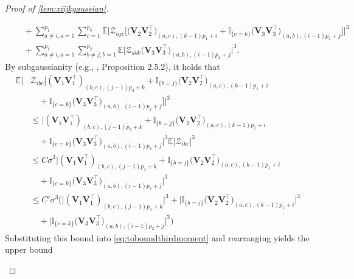 \documentclass[10pt]{article}
\newcommand{\0}{{\mathbf{0}}}
\newcommand{\1}{{\mathbf{1}}}
\newcommand{\E}{{\mathbf{E}}}
\renewcommand{\citet}{\cite}
\renewcommand{\t}{^{\top}}
\renewcommand{\E}{\mathbb{E}}
\begin{document}
\begin{proof}[Proof of \cref{lem:xiijkgaussian}]
\begin{itemize}
\begin{align}
    &\quad + \sum_{a\neq i, a=1}^{p_1} \sum_{c=1}^{p_3} \E \bigg| \mathcal{Z}_{ajc} \bigg[ \big(\mathbf{V}_2 \mathbf{V}_2\t \big)_{(a,c),(k-1)p_1 + i} + \mathbb{I}_{\{c = k \}} \big( \mathbf{V}_3 \mathbf{V}_3\t \big)_{(a,b),(i-1)p_2 + j} \bigg]\bigg|^3 \nonumber \\
    &\quad + \sum_{a\neq i, a=1}^{p_1} \sum_{b\neq j, b=1}^{p_2} \E \bigg| \mathcal{Z}_{abk} \big( \mathbf{V}_3 \mathbf{V}_3\t \big)_{(a,b),(i-1)p_2+j} \bigg|^3. \label{eq:toboundthirdmoment}
\end{align}
By subgaussianity (e.g., \citet{vershynin_high-dimensional_2018}, Proposition 2.5.2), it holds that
\begin{align*}
    \E \bigg|& \mathcal{Z}_{ibc}\bigg[ (\mathbf{V}_1 \mathbf{V}_1\t)_{(b,c),(j-1)p_3 + k}  + \mathbb{I}_{\{b=j\}} \big( \mathbf{V}_2 \mathbf{V}_2\t \big)_{(a,c),(k-1)p_1 + i} \\
    &\quad + \mathbb{I}_{\{c = k \}} \big( \mathbf{V}_3 \mathbf{V}_3\t \big)_{(a,b),(i-1)p_2 + j} \bigg]\bigg|^3 \\
    &\leq \bigg| (\mathbf{V}_1 \mathbf{V}_1\t)_{(b,c),(j-1)p_3 + k}  + \mathbb{I}_{\{b=j\}} \big( \mathbf{V}_2 \mathbf{V}_2\t \big)_{(a,c),(k-1)p_1 + i}  \\
    &\quad + \mathbb{I}_{\{c = k \}} \big( \mathbf{V}_3 \mathbf{V}_3\t \big)_{(a,b),(i-1)p_2 + j} \bigg|^3 \E | \mathcal{Z}_{ibc}|^3 \\
    &\leq C \sigma^3 \bigg| (\mathbf{V}_1 \mathbf{V}_1\t)_{(b,c),(j-1)p_3 + k}  + \mathbb{I}_{\{b=j\}} \big( \mathbf{V}_2 \mathbf{V}_2\t \big)_{(a,c),(k-1)p_1 + i}  \\
    &\quad + \mathbb{I}_{\{c = k \}} \big( \mathbf{V}_3 \mathbf{V}_3\t \big)_{(a,b),(i-1)p_2 + j} \bigg|^3 \\
    &\leq C' \sigma^3 \bigg( \bigg| (\mathbf{V}_1 \mathbf{V}_1\t)_{(b,c),(j-1)p_3 + k} \bigg|^3 +  \bigg| \mathbb{I}_{\{b=j\}} \big( \mathbf{V}_2 \mathbf{V}_2\t \big)_{(a,c),(k-1)p_1 + i}  \bigg|^3  \\
    &\quad +  \bigg| \mathbb{I}_{\{c = k \}} \big( \mathbf{V}_3 \mathbf{V}_3\t \big)_{(a,b),(i-1)p_2 + j} \bigg|^3 \bigg) %
\end{align*}
Substituting this bound into \cref{eq:toboundthirdmoment} and rearranging yields the upper bound

\end{itemize}
\end{proof}
\end{document}
